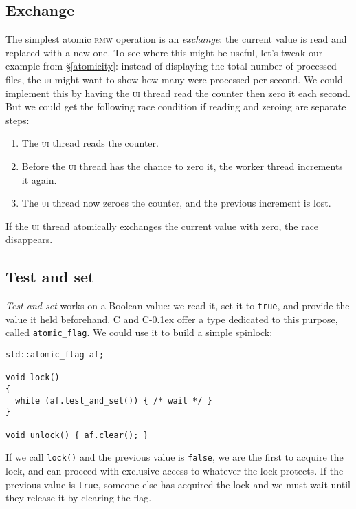 \documentclass[fontsize=\bodyfontsize, numbers=endperiod]{scrartcl}
\newcommand{\codesize}{\fontsize{\bodyfontsize}{\bodybaselineskip}}
\newcommand{\monobox}[1]{\mbox{\texttt{#1}}}
\newcommand{\cpp}[1]{C\kern-0.1ex\raisebox{0.15ex}{\texttt{++}}{\addfontfeature{Numbers=LowercaseOff}#1}}
\newcommand{\introduce}[1]{\textit{#1}}
\newcommand{\secref}[1]{\hyperref[#1]{\textsc{\S}\ref*{#1}}}
\newenvironment{colfigure}
  {\par\vspace{1\baselineskip minus 0.5\baselineskip}\noindent\minipage{\linewidth}}
  {\endminipage\vspace{1\baselineskip minus 0.7\baselineskip}}
\begin{document}
\begin{multicols}{2}
\subsection{Exchange}
\label{exchange}

The simplest atomic \textsc{rmw} operation is an \introduce{exchange}:
the current value is read and replaced with a new one.
To see where this might be useful,
let's tweak our example from \secref{atomicity}:
instead of displaying the total number of processed files,
the \textsc{ui} might want to show how many were processed per second.
We could implement this by having the \textsc{ui} thread read the counter then
zero it each second.
But we could get the following race condition
if reading and zeroing are separate steps:
\begin{enumerate}
\item The \textsc{ui} thread reads the counter.
\item Before the \textsc{ui} thread has the chance to zero it,
    the worker thread increments it again.
\item The \textsc{ui} thread now zeroes the counter, and the previous increment
    is lost.
\end{enumerate}
If the \textsc{ui} thread atomically exchanges the current value with zero,
the race disappears.

\subsection{Test and set}

\introduce{Test-and-set} works on a Boolean value:
we read it, set it to \texttt{true}, and provide the value it
held beforehand.
C and \cpp{} offer a type dedicated to this purpose, called \monobox{atomic\_flag}.
We could use it to build a simple spinlock:
\label{spinlock}
\begin{colfigure}
\begin{verbatim}
std::atomic_flag af;

void lock()
{
  while (af.test_and_set()) { /* wait */ }
}

void unlock() { af.clear(); }
\end{verbatim}
\end{colfigure}
If we call \texttt{lock()} and the previous value is
\texttt{false}, we are the first to acquire the lock,
and can proceed with exclusive access to whatever the lock protects.
If the previous value is \texttt{true},
someone else has acquired the lock and we must
wait until they release it by clearing the flag.


\end{multicols}
\end{document}
